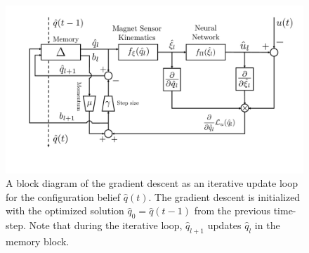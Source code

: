 \begin{figure}[ht]
\centering
    \includegraphics[width=0.8\columnwidth]{promasens/figures/methodology/blockdiagram_gradient_descent_v6_cropped.pdf}
    \caption{%
    A block diagram of the gradient descent as an iterative update loop for the configuration belief $\hat{q}(t)$. The gradient descent is initialized with the optimized solution $\hat{q}_0 = \hat{q}(t-1)$ from the previous time-step. Note that during the iterative loop, $\hat{q}_{l+1}$ updates $\hat{q}_{l}$ in the memory block.}\label{fig:promasens:blockdiagram_gradient_descent}
\end{figure}


